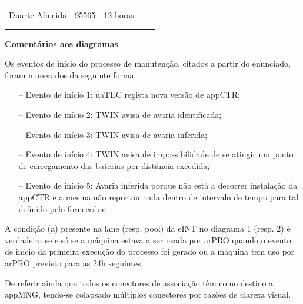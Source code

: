 \documentclass{article}
\begin{document}
\begin{table}[H]
\begin{tabular}{|l|l|l|l|l}
        \multicolumn{1}{|l|}{}                   & \multicolumn{1}{l|}{}       & \multicolumn{1}{l|}{}                             & \multicolumn{1}{l|}{}                   &  \\
        \multicolumn{1}{|c|}{Duarte Almeida}     & \multicolumn{1}{c|}{95565}  & \multicolumn{1}{c|}{12 horas}                     & \multicolumn{1}{l|}{}                   &  \\
        \multicolumn{1}{|l|}{}                   & \multicolumn{1}{l|}{}       & \multicolumn{1}{l|}{}                             & \multicolumn{1}{l|}{}                   &  \\
        \multicolumn{1}{|l|}{}                   & \multicolumn{1}{l|}{}       & \multicolumn{1}{l|}{}                             & \multicolumn{1}{l|}{}                   &  \\ \cline{1-4}
        \end{tabular}
        \end{table}

    \vspace{0.3cm}

    \noindent \large \textbf{Comentários aos diagramas}

    \vspace{0.5em} \normalsize
    Os eventos de início do processo de manutenção, citados a partir do enunciado, foram numerados da seguinte forma:
    \vspace{-0.1em}
    \begin{itemize}
        \itemsep0em 
        \item[--] Evento de início 1: uaTEC regista nova versão de appCTR;
        \item[--] Evento de início 2: TWIN avisa de avaria identificada;
        \item[--] Evento de início 3: TWIN avisa de avaria inferida;
        \item[--] Evento de início 4: TWIN avisa de impossibilidade de se atingir um ponto de carregamento das baterias por distância excedida;
        \item[--] Evento de início 5: Avaria inferida porque não está a decorrer instalação da appCTR e a mesma não reportou nada dentro de intervalo de tempo para tal definido pelo fornecedor. 
    \end{itemize} \par
    \vspace{-0.1em}
    A condição (a) presente na lane (resp. pool) da eINT no diagrama 1 (resp. 2) é verdadeira se e só se a máquina estava a ser usada por arPRO quando o evento
    de início da primeira execução do processo foi gerado ou a máquina tem uso por arPRO previsto para as 24h seguintes. \par
    De referir ainda que todos os conectores de associação têm como destino a appMNG, tendo-se colapsado múltiplos conectores por razões de clareza visual.
    \pagebreak
\end{document}
